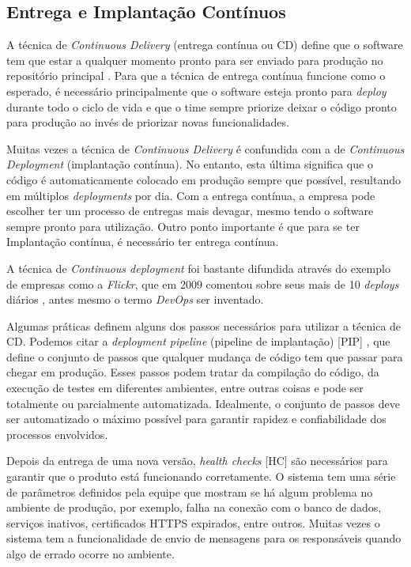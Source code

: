 \subsection{Entrega e Implantação Contínuos}

A técnica de \emph{Continuous Delivery} (entrega contínua ou CD) define que o software tem que estar a qualquer momento pronto para ser enviado para produção no repositório principal \cite{fowlerCD}. Para que a técnica de entrega contínua funcione como o esperado, é necessário principalmente que o software esteja pronto para \emph{deploy} durante todo o ciclo de vida e que o time sempre priorize deixar o código pronto para produção ao invés de priorizar novas funcionalidades.

Muitas vezes a técnica de \emph{Continuous Delivery} é confundida com a de \emph{Continuous Deployment} (implantação contínua). No entanto, esta última significa que o código é automaticamente colocado em produção sempre que possível, resultando em múltiplos \emph{deployments} por dia. Com a entrega contínua, a empresa pode escolher ter um processo de entregas mais devagar, mesmo tendo o software sempre pronto para utilização. Outro ponto importante é que para se ter Implantação contínua, é necessário ter entrega contínua.

A técnica de \emph{Continuous deployment} foi bastante difundida através do exemplo de empresas como a \emph{Flickr}, que em 2009 comentou sobre seus mais de 10 \emph{deploys} diários \cite{flickrTalk}, antes mesmo o termo \emph{DevOps} ser inventado. 

Algumas práticas definem alguns dos passos necessários para utilizar a técnica de CD. Podemos citar a \emph{deployment pipeline} (pipeline de implantação) [PIP] \cite{devopsBook}, que define o conjunto de passos que qualquer mudança de código tem que passar para chegar em produção. Esses passos podem tratar da compilação do código, da execução de testes em diferentes ambientes, entre outras coisas e pode ser totalmente ou parcialmente automatizada. Idealmente, o conjunto de passos deve ser automatizado o máximo possível para garantir rapidez e confiabilidade dos processos envolvidos.

Depois da entrega de uma nova versão, \emph{health checks} [HC] \cite{devopsBook} são necessários para garantir que o produto está funcionando corretamente. O sistema tem uma série de parâmetros definidos pela equipe que mostram se há algum problema no ambiente de produção, por exemplo, falha na conexão com o banco de dados, serviços inativos, certificados HTTPS expirados, entre outros. Muitas vezes o sistema tem a funcionalidade de envio de mensagens para os responsáveis quando algo de errado ocorre no ambiente.

